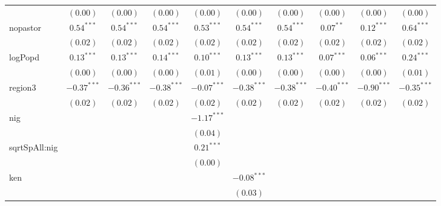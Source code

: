 \begin{sidewaystable}
\begin{center}
{\begin{tabular}{l c c c c c c c c c}
                  & $(0.00)$      & $(0.00)$      & $(0.00)$      & $(0.00)$      & $(0.00)$      & $(0.00)$      & $(0.00)$      & $(0.00)$      & $(0.00)$      \\
nopastor          & $0.54^{***}$  & $0.54^{***}$  & $0.54^{***}$  & $0.53^{***}$  & $0.54^{***}$  & $0.54^{***}$  & $0.07^{**}$   & $0.12^{***}$  & $0.64^{***}$  \\
                  & $(0.02)$      & $(0.02)$      & $(0.02)$      & $(0.02)$      & $(0.02)$      & $(0.02)$      & $(0.02)$      & $(0.02)$      & $(0.02)$      \\
logPopd           & $0.13^{***}$  & $0.13^{***}$  & $0.14^{***}$  & $0.10^{***}$  & $0.13^{***}$  & $0.13^{***}$  & $0.07^{***}$  & $0.06^{***}$  & $0.24^{***}$  \\
                  & $(0.00)$      & $(0.00)$      & $(0.00)$      & $(0.01)$      & $(0.00)$      & $(0.00)$      & $(0.00)$      & $(0.00)$      & $(0.01)$      \\
region3           & $-0.37^{***}$ & $-0.36^{***}$ & $-0.38^{***}$ & $-0.07^{***}$ & $-0.38^{***}$ & $-0.38^{***}$ & $-0.40^{***}$ & $-0.90^{***}$ & $-0.35^{***}$ \\
                  & $(0.02)$      & $(0.02)$      & $(0.02)$      & $(0.02)$      & $(0.02)$      & $(0.02)$      & $(0.02)$      & $(0.02)$      & $(0.02)$      \\
nig               &               &               &               & $-1.17^{***}$ &               &               &               &               &               \\
                  &               &               &               & $(0.04)$      &               &               &               &               &               \\
sqrtSpAll:nig     &               &               &               & $0.21^{***}$  &               &               &               &               &               \\
                  &               &               &               & $(0.00)$      &               &               &               &               &               \\
ken               &               &               &               &               & $-0.08^{***}$ &               &               &               &               \\
                  &               &               &               &               & $(0.03)$      &               &               &               &               \\

\end{tabular}}
\end{center}
\end{sidewaystable}
